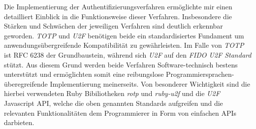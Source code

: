 \documentclass[11pt,a4paper,ngerman]{scrreprt}
\begin{document}
Die Implementierung der Authentifizierungsverfahren ermöglichte mir einen detailliert Einblick in die Funktionsweise dieser Verfahren. Insbesondere die Stärken und Schwächen der jeweiligen Verfahren sind deutlich erkennbar geworden. \textit{TOTP} und \textit{U2F} benötigen beide ein standardisiertes Fundament um anwendungsübergreifende Kompatibilität zu gewährleisten. Im Falle von \textit{TOTP} ist RFC 6238 der Grundbaustein, während sich \textit{U2F} auf den \textit{FIDO U2F Standard} stützt. Aus diesem Grund werden beide Verfahren Software-technisch bestens unterstützt und ermöglichten somit eine reibungslose Programmiersprachen-überegreifende Implementierung meinerseits. Von besonderer Wichtigkeit sind die hierbei verwendeten Ruby Bibiliotheken \textit{rotp} und \textit{ruby-u2f} und die \textit{U2F} Javascript API, welche die oben genannten Standards aufgreifen und die relevanten Funktionalitäten dem Programmierer in Form von einfachen APIs darbieten.
\end{document}
